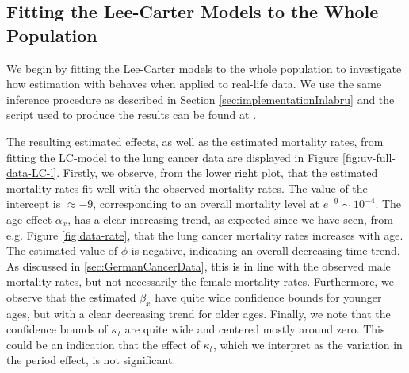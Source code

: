 \subsection{Fitting the Lee-Carter Models to the Whole Population}
\label{sec:LC-full-data}
We begin by fitting the Lee-Carter models to the whole population to investigate how estimation with \inlabru behaves when applied to real-life data. We use the same inference procedure as described in Section \ref{sec:implementationInlabru} and the script used to produce the results can be found at 
.

\newpar The resulting estimated effects, as well as the estimated mortality rates, from fitting the LC-model to the lung cancer data are displayed in Figure \ref{fig:uv-full-data-LC-l}. Firstly, we observe, from the lower right plot, that the estimated mortality rates fit well with the observed mortality rates. The value of the intercept is $\approx -9$, corresponding to an overall mortality level at $e^{-9} \sim 10^{-4}$. The age effect $\alpha_x$, has a clear increasing trend, as expected since we have seen, from e.g. Figure \ref{fig:data-rate}, that the lung cancer mortality rates increases with age. The estimated value of $\phi$ is negative, indicating an overall decreasing time trend. As discussed in \ref{sec:GermanCancerData}, this is in line with the observed male mortality rates, but not necessarily the female mortality rates. Furthermore, we observe that the estimated $\beta_x$ have quite wide confidence bounds for younger ages, but with a clear decreasing trend for older ages. Finally, we note that the confidence bounds of $\kappa_t$ are quite wide and centered mostly around zero. This could be an indication that the effect of $\kappa_t$, which we interpret as the variation in the period effect, is not significant. 

